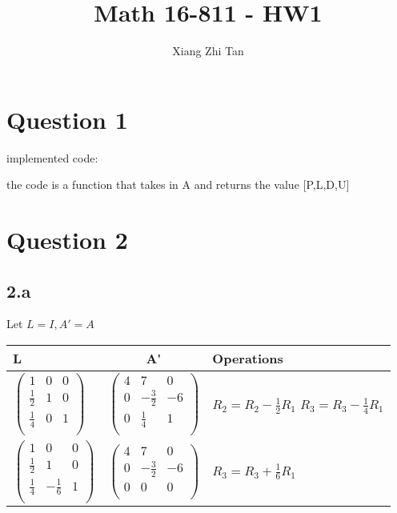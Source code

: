 \documentclass{article}
\begin{document}
\title{Math 16-811 - HW1}
\author{Xiang Zhi Tan}

\maketitle

\section{Question 1}
implemented code:

the code is a function that takes in A and returns the value [P,L,D,U]
\section{Question 2}
\subsection*{2.a}
Let $ L = I, A' = A$ \\
\begin{tabular}{|l|c|p{5cm}|}
\hline
\textbf{L} & \textbf{A\'} & \textbf{Operations}\\
\hline
$\begin{pmatrix}
    1 & 0 & 0 \\
    \frac{1}{2} & 1 & 0 \\
    \frac{1}{4} & 0 & 1 \\
\end{pmatrix}$
&
$\begin{pmatrix}
    4 & 7 & 0 \\
    0 & -\frac{3}{2} & -6 \\
    0 & \frac{1}{4} & 1 \\
\end{pmatrix}$
&
$R_2 = R_2 - \frac{1}{2} R_1 $ \newline
$R_3 = R_3 - \frac{1}{4} R_1$ \\
\hline
$\begin{pmatrix}
    1 & 0 & 0 \\
    \frac{1}{2} & 1 & 0 \\
    \frac{1}{4} & -\frac{1}{6} & 1 \\
\end{pmatrix}$
&
$\begin{pmatrix}
    4 & 7 & 0 \\
    0 & -\frac{3}{2} & -6 \\
    0 & 0 & 0 \\
\end{pmatrix}$
&
$R_3 = R_3 + \frac{1}{6} R_1$ \\
\hline
\end{tabular} \\
\end{document}
